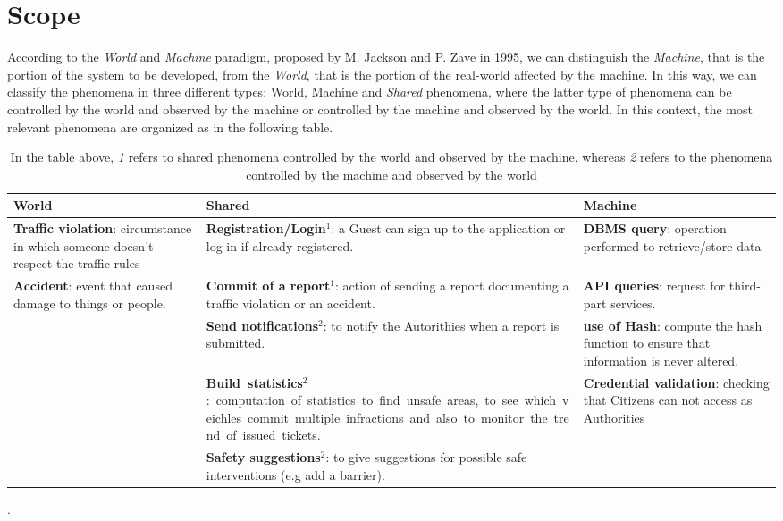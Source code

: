 \documentclass{report}
\begin{document}
\section{Scope}
According to the \textit{World} and \textit{Machine} paradigm, proposed by M. Jackson and P. Zave in 1995, we can distinguish the \textit{Machine}, that is the portion of the system to be developed, from the \textit{World}, that is the portion of the real-world affected by the machine. In this way, we can classify the phenomena in three different types: World, Machine and \textit{Shared} phenomena, where the latter type of phenomena can be controlled by the world and observed by the machine or controlled by the machine and observed by the world.
\newline
In this context, the most relevant phenomena are organized as in the following table.
\begin{table}[!ht]
		\begin{center}
		\begin{tabular}{|C{3.5cm}||C{3.5cm}||C{3.5cm}|}
			\toprule
			\textbf{World} &\textbf{Shared}& \textbf{Machine}\\
			\midrule
			\midrule
			\textbf{Traffic violation}: circumstance in which someone doesn't respect the traffic rules &\textbf{Registration/Login}$^{1}$: a Guest can sign up to the application or log in if already registered.&\textbf{DBMS query}: operation performed to retrieve/store data\\
			\midrule
			\textbf{Accident}: event that caused damage to things or people.&\textbf{Commit of a report}$^{1}$: action of sending a report documenting a traffic violation or an accident.&\textbf{API queries}: request for third-part services.\\
			\midrule
			&\textbf{Send notifications}$^{2}$: to notify the Autorithies when a report is submitted.&\textbf{use of Hash}: compute the hash function to ensure that information is never altered.\\
			\midrule
			&\textbf{Build statistics}$^{2}$: computation of statistics to find unsafe areas, to see which veichles commit multiple infractions and also to monitor the trend of issued tickets.&\textbf{Credential validation}: checking that Citizens can not access as Authorities\\ 
			\midrule
			&\textbf{Safety suggestions}$^{2}$: to give suggestions for possible safe interventions (e.g add a barrier).&\\
			\bottomrule
		\end{tabular}
		\end{center}
		\caption{In the table above, \textit{1} refers to shared phenomena controlled by the world and observed by the machine, whereas \textit{2} refers to the phenomena controlled by the machine and observed by the world}.
		\label{tab:multicol}
	\end{table}
	
\end{document}
